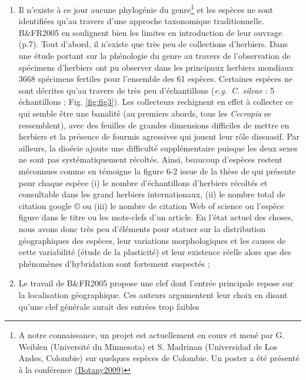 \documentclass[a4paper]{article}
\let\rmarkdownfootnote\footnote%
\def\footnote{\protect\rmarkdownfootnote}
\theoremstyle{definition}
\theoremstyle{definition}
\theoremstyle{definition}
\theoremstyle{remark}
\begin{document}
\begin{enumerate}
\def\labelenumi{(\roman{enumi})}
\item
  Il n'existe à ce jour aucune phylogénie du genre\footnote{A notre
    connaissance, un projet est actuellement en cours et mené par G.
    Weiblen (Université du Minnesota) et S. Madrinan (Universidad de Los
    Andes, Colombie) sur quelques espèces de Colombie. Un poster a été
    présenté à la conférence
    \href{http://2009.botanyconference.org/engine/search/index.php?func=detail\&aid=56}{(Botany2009)}}
  et les espèces ne sont identifiées qu'au travers d'une approche
  taxonomique traditionnelle. B\&FR2005 en soulignent bien les limites
  en introduction de leur ouvrage (p.7). Tout d'abord, il n'existe que
  très peu de collections d'herbiers. Dans une étude portant sur la
  phénologie du genre au travers de l'observation de spécimens
  d'herbiers \citep{Zalamea2011} ont pu observer dans les principaux
  herbiers mondiaux 3668 spécimens fertiles pour l'ensemble des 61
  espèces. Certaines espèces ne sont décrites qu'au travers de très peu
  d'échantillons (\emph{e.g.~C. silvae} : 5 échantillons ; Fig.
  \ref{fig:fig3}). Les collecteurs rechignent en effet à collecter ce
  qui semble être une banalité (au premiers abords, tous les
  \emph{Cecropia} se ressemblent), avec des feuilles de grandes
  dimensions difficiles de mettre en herbiers et la présence de fourmis
  agressives qui jouent leur rôle dissuasif. Par ailleurs, la dioécie
  ajoute une difficulté supplémentaire puisque les deux sexes ne sont
  pas systématiquement récoltés. Ainsi, beaucoup d'espèces restent
  méconnues comme en témoigne la figure 6-2 issue de la thèse de
  \citet{Zalamea2009} qui présente pour chaque espèce (i) le nombre
  d'échantillons d'herbiers récoltés et consultable dans les grand
  herbiers internationaux, (ii) le nombre total de citation google © ou
  (iii) le nombre de citation Web of science ou l'espèce figure dans le
  titre ou les mots-clefs d'un article. En l'état actuel des choses,
  nous avons donc très peu d'éléments pour statuer sur la distribution
  géographiques des espèces, leur variations morphologiques et les
  causes de cette variabilité (étude de la plasticité) et leur existence
  réelle alors que des phénomènes d'hybridation sont fortement suspectés
  \citep{Webber2011};
\item
  Le travail de B\&FR2005 propose une clef dont l'entrée principale
  repose sur la localisation géographique. Ces auteurs argumentent leur
  choix en disant qu'une clef générale aurait des entrées trop faibles

\end{enumerate}
\end{document}
